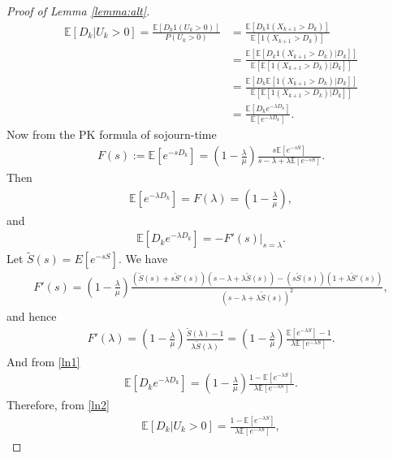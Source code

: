 \documentclass[11pt,letterpaper,reqno]{article}
\theoremstyle{thmstyleone}%
\theoremstyle{thmstyletwo}%
\theoremstyle{thmstylethree}%
\numberwithin{equation}{section}
\begin{document}
\begin{proof}[Proof of Lemma \ref{lemma:alt}]
\begin{align}\label{ln2}
    \mathbb E[D_{k}|U_k>0]=\frac{\mathbb E[D_k\mathrm{1}(U_k>0)]}{P(U_k>0)}&=\frac{\mathbb E[D_k\mathrm{1}(X_{k+1}>D_k)]}{\mathbb E[1(X_{k+1}>D_k)]} \nonumber\\
    &=\frac{\mathbb E\left[ \mathbb E[D_k\mathrm{1}(X_{k+1}>D_k)|D_k]\right]}{\mathbb E\left[ \mathbb E[\mathrm{1}(X_{k+1}>D_k)|D_k]\right]} \nonumber\\
    &=\frac{\mathbb E\left[D_k \mathbb E[\mathrm{1}(X_{k+1}>D_k)|D_k]\right]}{\mathbb E\left[ \mathbb E[\mathrm{1}(X_{k+1}>D_k)|D_k]\right]} \nonumber\\
    &=\frac{\mathbb E[D_ke^{-\lambda D_k}]}{\mathbb E[e^{-\lambda D_k}]}.
\end{align}
Now from the PK formula of sojourn-time
\begin{align*}
   F(s) := \mathbb E[e^{- s D_k}]=\left(1-\frac{\lambda}{\mu}\right)\frac{s\mathbb E[e^{-s S}]}{s-\lambda+\lambda \mathbb E[e^{-sS}]}.
\end{align*}
Then 
\begin{align*}
    \mathbb E[e^{-\lambda D_k}]=F(\lambda)=\left(1-\frac{\lambda}{\mu}\right),
\end{align*}
and 
\begin{align}\label{ln1}
    \mathbb E[D_ke^{-\lambda D_k}]=-F'(s)|_{s=\lambda}.
\end{align}
Let $\tilde{S}(s)=E[e^{-sS}]$. We have
\begin{align}\label{ln4}
    F'(s)=\left(1-\frac{\lambda}{\mu} \right)\frac{\left(\tilde{S}(s)+s\tilde{S}'(s)\right)\left(s-\lambda+\lambda\tilde{S}(s)\right)-\left(s\tilde{S}(s)\right)\left(1+\lambda \tilde{S}'(s)\right)}{\left(s-\lambda+\lambda\tilde{S}(s)\right)^2},
\end{align}
and hence
\begin{align*}
     F'(\lambda)=\left(1-\frac{\lambda}{\mu} \right)\frac{\tilde{S}(\lambda)-1}{\lambda\tilde{S}(\lambda)}=\left(1-\frac{\lambda}{\mu} \right)\frac{\mathbb E[e^{-\lambda S}]-1}{\lambda\mathbb E[e^{-\lambda S}]}.
\end{align*}
And from \eqref{ln1}
\begin{align*}
     \mathbb E[D_ke^{-\lambda D_k}]=\left(1-\frac{\lambda}{\mu} \right)\frac{1-\mathbb E[e^{-\lambda S}]}{\lambda\mathbb E[e^{-\lambda S}]}.
\end{align*}
Therefore, from \eqref{ln2}
\begin{align}\label{ln8}
    \mathbb E[D_{k}|U_k>0]=\frac{1-\mathbb E[e^{-\lambda S}]}{\lambda \mathbb E[e^{-\lambda S}]},

\end{align}
\end{proof}
\end{document}
